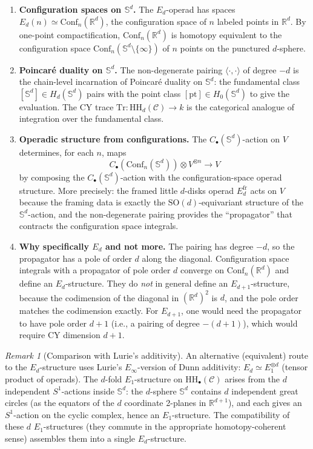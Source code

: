\documentclass[11pt]{article}
\theoremstyle{plain}
\theoremstyle{definition}
\theoremstyle{remark}
\newtheorem{remark}[theorem]{Remark}
\newcommand{\Einf}{E_\infty}
\newcommand{\Eone}{E_1}
\newcommand{\HH}{\mathrm{HH}}
\newcommand{\Tr}{\mathrm{Tr}}
\newcommand{\Sd}{\mathbb{S}^d}
\newcommand{\cC}{\mathcal{C}}
\begin{document}
\begin{enumerate}[label=\textbf{(\arabic*)}]
\item \textbf{Configuration spaces on $\Sd$.}\; The $E_d$-operad has spaces $E_d(n) \simeq \mathrm{Conf}_n(\mathbb{R}^d)$, the configuration space of $n$ labeled points in $\mathbb{R}^d$. By one-point compactification, $\mathrm{Conf}_n(\mathbb{R}^d)$ is homotopy equivalent to the configuration space $\mathrm{Conf}_n(\Sd \setminus \{\infty\})$ of $n$ points on the punctured $d$-sphere.

\item \textbf{Poincar\'e duality on $\Sd$.}\; The non-degenerate pairing $\langle \cdot, \cdot \rangle$ of degree $-d$ is the chain-level incarnation of Poincar\'e duality on $\Sd$: the fundamental class $[\Sd] \in H_d(\Sd)$ pairs with the point class $[\mathrm{pt}] \in H_0(\Sd)$ to give the evaluation. The CY trace $\Tr \colon \HH_d(\cC) \to k$ is the categorical analogue of integration over the fundamental class.

\item \textbf{Operadic structure from configurations.}\; The $C_\bullet(\Sd)$-action on $V$ determines, for each $n$, maps
\[
C_\bullet(\mathrm{Conf}_n(\Sd)) \otimes V^{\otimes n} \longrightarrow V
\]
by composing the $C_\bullet(\Sd)$-action with the configuration-space operad structure. More precisely: the framed little $d$-disks operad $E_d^{\mathrm{fr}}$ acts on $V$ because the framing data is exactly the $\mathrm{SO}(d)$-equivariant structure of the $\Sd$-action, and the non-degenerate pairing provides the ``propagator'' that contracts the configuration space integrals.

\item \textbf{Why specifically $E_d$ and not more.}\; The pairing has degree $-d$, so the propagator has a pole of order $d$ along the diagonal. Configuration space integrals with a propagator of pole order $d$ converge on $\mathrm{Conf}_n(\mathbb{R}^d)$ and define an $E_d$-structure. They do \emph{not} in general define an $E_{d+1}$-structure, because the codimension of the diagonal in $(\mathbb{R}^d)^2$ is $d$, and the pole order matches the codimension exactly. For $E_{d+1}$, one would need the propagator to have pole order $d+1$ (i.e., a pairing of degree $-(d+1)$), which would require CY dimension $d+1$.
\end{enumerate}

\begin{remark}[Comparison with Lurie's additivity]
\label{rem:lurie-additivity}
An alternative (equivalent) route to the $E_d$-structure uses Lurie's $\Einf$-version of Dunn additivity: $E_d \simeq E_1^{\otimes d}$ (tensor product of operads). The $d$-fold $\Eone$-structure on $\HH_\bullet(\cC)$ arises from the $d$ independent $S^1$-actions inside $\Sd$: the $d$-sphere $\Sd$ contains $d$ independent great circles (as the equators of the $d$ coordinate 2-planes in $\mathbb{R}^{d+1}$), and each gives an $S^1$-action on the cyclic complex, hence an $\Eone$-structure. The compatibility of these $d$ $\Eone$-structures (they commute in the appropriate homotopy-coherent sense) assembles them into a single $E_d$-structure.
\end{remark}
\end{document}
